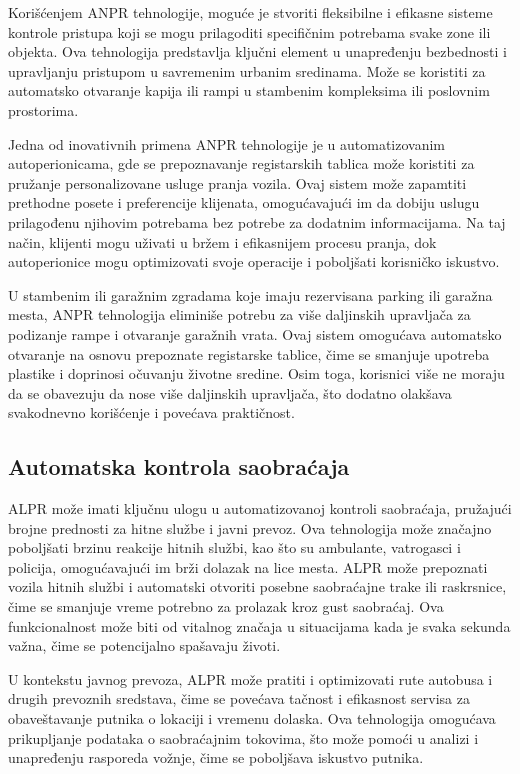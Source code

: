 \documentclass[a4paper,12pt]{article}
\begin{document}
	Korišćenjem ANPR tehnologije, moguće je stvoriti fleksibilne i efikasne sisteme kontrole pristupa koji se mogu prilagoditi specifičnim potrebama svake zone ili objekta. Ova tehnologija predstavlja ključni element u unapređenju bezbednosti i upravljanju pristupom u savremenim urbanim sredinama.
	Može se koristiti za automatsko otvaranje kapija ili rampi u stambenim kompleksima ili poslovnim prostorima.
	
	Jedna od inovativnih primena ANPR tehnologije je u automatizovanim autoperionicama, gde se prepoznavanje registarskih tablica može koristiti za pružanje personalizovane usluge pranja vozila. Ovaj sistem može zapamtiti prethodne posete i preferencije klijenata, omogućavajući im da dobiju uslugu prilagođenu njihovim potrebama bez potrebe za dodatnim informacijama. Na taj način, klijenti mogu uživati u bržem i efikasnijem procesu pranja, dok autoperionice mogu optimizovati svoje operacije i poboljšati korisničko iskustvo.
	
	U stambenim ili garažnim zgradama koje imaju rezervisana parking ili garažna mesta, ANPR tehnologija eliminiše potrebu za više daljinskih upravljača za podizanje rampe i otvaranje garažnih vrata. Ovaj sistem omogućava automatsko otvaranje na osnovu prepoznate registarske tablice, čime se smanjuje upotreba plastike i doprinosi očuvanju životne sredine. Osim toga, korisnici više ne moraju da se obavezuju da nose više daljinskih upravljača, što dodatno olakšava svakodnevno korišćenje i povećava praktičnost.
	
	\subsection{Automatska kontrola saobraćaja}
	ALPR može imati ključnu ulogu u automatizovanoj kontroli saobraćaja, pružajući brojne prednosti za hitne službe i javni prevoz. Ova tehnologija može značajno poboljšati brzinu reakcije hitnih službi, kao što su ambulante, vatrogasci i policija, omogućavajući im brži dolazak na lice mesta. ALPR može prepoznati vozila hitnih službi i automatski otvoriti posebne saobraćajne trake ili raskrsnice, čime se smanjuje vreme potrebno za prolazak kroz gust saobraćaj. Ova funkcionalnost može biti od vitalnog značaja u situacijama kada je svaka sekunda važna, čime se potencijalno spašavaju životi.
	
	U kontekstu javnog prevoza, ALPR može pratiti i optimizovati rute autobusa i drugih prevoznih sredstava, čime se povećava tačnost i efikasnost servisa za obaveštavanje putnika o lokaciji i vremenu dolaska. Ova tehnologija omogućava prikupljanje podataka o saobraćajnim tokovima, što može pomoći u analizi i unapređenju rasporeda vožnje, čime se poboljšava iskustvo putnika.
	
\end{document}
